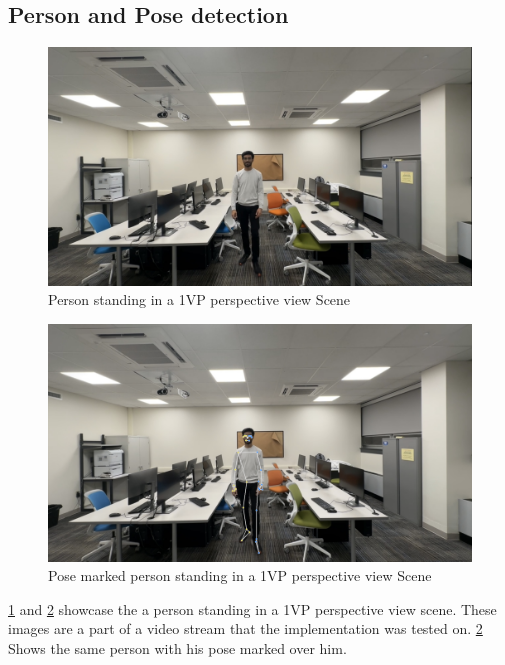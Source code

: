\subsection{Person and Pose detection}

\begin{figure}[H]
    \centering
    \includegraphics[width=1.0\textwidth]{1vp person.jpg}
    \caption{Person standing in a 1VP perspective view Scene}
    \label{fig: Person standing in a 1VP perspective view Scene}
\end{figure}

\begin{figure}[H]
    \centering
    \includegraphics[width=1.0\textwidth]{1vp person pose.png}
    \caption{Pose marked person standing in a 1VP perspective view Scene}
    \label{fig: Pose marked person standing in a 1VP perspective view Scene}
\end{figure}


\ref{fig: Person standing in a 1VP perspective view Scene} and \ref{fig: Pose marked person standing in a 1VP perspective view Scene} showcase the a person standing in a 1VP perspective view scene. These images are a part of a video stream that the implementation was tested on. \ref{fig: Pose marked person standing in a 1VP perspective view Scene} Shows the same person with his pose marked over him.\newline

